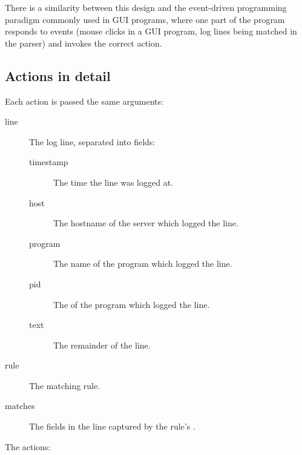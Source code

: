 \documentclass[a4paper,12pt,draft]{article}
\begin{document}
There is a similarity between this design and the event-driven programming
paradigm commonly used in GUI programs, where one part of the program
responds to events (mouse clicks in a GUI program, log lines being matched
in the parser) and invokes the correct action.

\subsection{Actions in detail}

\label{actions-in-detail}

Each action is passed the same arguments:

\begin{description}

    \item [line] The log line, separated into fields:

        \begin{description}

            \item [timestamp] The time the line was logged at.

            \item [host] The hostname of the server which logged the line.

            \item [program] The name of the program which logged the line.

            \item [pid] The \pid{} of the program which logged the line.

            \item [text] The remainder of the line.

        \end{description}

    \item [rule] The matching rule.

    \item [matches] The fields in the line captured by the rule's \regex{}.

\end{description}

The actions:
\end{document}

